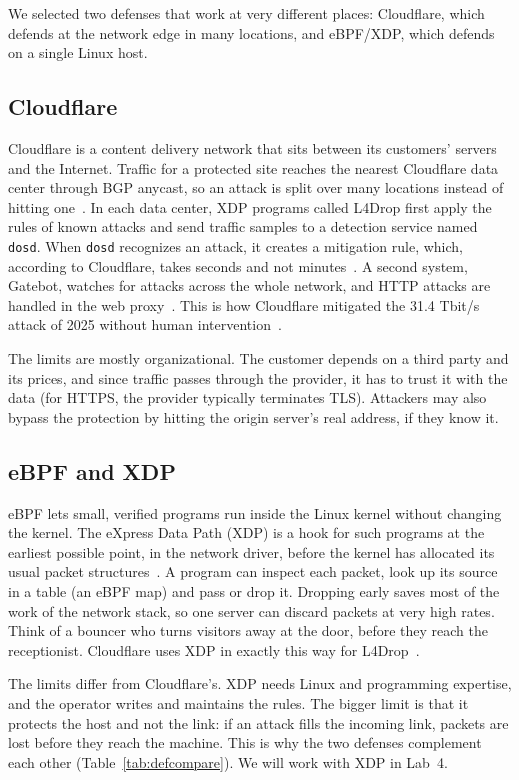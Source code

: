 We selected two defenses that work at very different places: Cloudflare, which defends at the network edge in many locations, and eBPF/XDP, which defends on a single Linux host.

\subsection{Cloudflare}

Cloudflare is a content delivery network that sits between its customers' servers and the Internet. Traffic for a protected site reaches the nearest Cloudflare data center through BGP anycast, so an attack is split over many locations instead of hitting one~\cite{cf_dosd}. In each data center, XDP programs called L4Drop first apply the rules of known attacks and send traffic samples to a detection service named \texttt{dosd}. When \texttt{dosd} recognizes an attack, it creates a mitigation rule, which, according to Cloudflare, takes seconds and not minutes~\cite{itbrief_ebpf}. A second system, Gatebot, watches for attacks across the whole network, and HTTP attacks are handled in the web proxy~\cite{cf_dosd}. This is how Cloudflare mitigated the 31.4 Tbit/s attack of 2025 without human intervention~\cite{thn_aisuru}.

The limits are mostly organizational. The customer depends on a third party and its prices, and since traffic passes through the provider, it has to trust it with the data (for HTTPS, the provider typically terminates TLS). Attackers may also bypass the protection by hitting the origin server's real address, if they know it.

\subsection{eBPF and XDP}

eBPF lets small, verified programs run inside the Linux kernel without changing the kernel. The eXpress Data Path (XDP) is a hook for such programs at the earliest possible point, in the network driver, before the kernel has allocated its usual packet structures~\cite{xdp}. A program can inspect each packet, look up its source in a table (an eBPF map) and pass or drop it. Dropping early saves most of the work of the network stack, so one server can discard packets at very high rates. Think of a bouncer who turns visitors away at the door, before they reach the receptionist. Cloudflare uses XDP in exactly this way for L4Drop~\cite{cf_dosd}.

The limits differ from Cloudflare's. XDP needs Linux and programming expertise, and the operator writes and maintains the rules. The bigger limit is that it protects the host and not the link: if an attack fills the incoming link, packets are lost before they reach the machine. This is why the two defenses complement each other (Table~\ref{tab:defcompare}). We will work with XDP in Lab~4.

